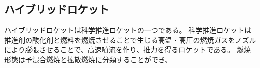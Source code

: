 \subsection{ハイブリッドロケット}
ハイブリッドロケットは科学推進ロケットの一つである。
科学推進ロケットは推進剤の酸化剤と燃料を燃焼させることで生じる高温・高圧の燃焼ガスをノズルにより膨張させることで、高速噴流を作り、推力を得るロケットである。
燃焼形態は予混合燃焼と拡散燃焼に分類することができ、

